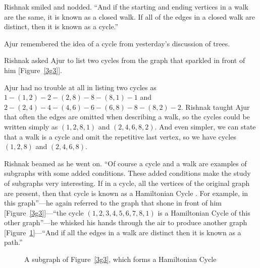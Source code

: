 Rishnak smiled and nodded. ``And if the starting and ending vertices in a walk are the same, it is known as a closed walk. If all of the edges in a closed walk are distinct, then it is known as a cycle.'' 

Ajur remembered the idea of a cycle from yesterday's discussion of trees.

Rishnak asked Ajur to list two cycles from the graph that sparkled in front of him [Figure~\ref{3g3}].

Ajur had no trouble at all in listing two cycles as $1-(1,2)-2-(2,8)-8-(8,1)-1$ and $2-(2,4)-4-(4,6)-6-(6,8)-8-(8,2)-2$. Rishnak taught Ajur that often the edges are omitted when describing a walk, so the cycles could be written simply as $(1,2,8,1)$ and $(2,4,6,8,2)$. And even simpler, we can state that a walk is a cycle and omit the repetitive last vertex, so we have cycles $(1,2,8)$ and $(2,4,6,8)$.

Rishnak beamed as he went on.  ``Of course a cycle and a walk are examples of subgraphs with some added conditions. These added conditions make the study of subgraphs very interesting. If in a cycle, all the vertices of the original graph are present, then that cycle is known as a Hamiltonian Cycle . For example, in this graph''---he again referred to the graph that shone in front of him [Figure~\ref{3g3}]---``the cycle $(1,2,3,4,5,6,7,8,1)$ is a Hamiltonian Cycle of this other graph''---he whisked his hands through the air to produce another graph [Figure~\ref{3g4}]---``And if all the edges in a walk are distinct then it is known as a path.''

\begin{figure}
\begin{center}
\caption{A subgraph of Figure~\ref{3g3}, which forms a Hamiltonian Cycle}\label{3g4}
\end{center}
\end{figure}


